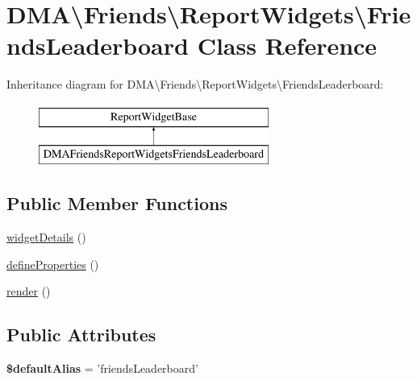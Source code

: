 \hypertarget{classDMA_1_1Friends_1_1ReportWidgets_1_1FriendsLeaderboard}{\section{D\-M\-A\textbackslash{}Friends\textbackslash{}Report\-Widgets\textbackslash{}Friends\-Leaderboard Class Reference}
\label{classDMA_1_1Friends_1_1ReportWidgets_1_1FriendsLeaderboard}
}
Inheritance diagram for D\-M\-A\textbackslash{}Friends\textbackslash{}Report\-Widgets\textbackslash{}Friends\-Leaderboard\-:\begin{figure}[H]
\begin{center}
\leavevmode
\includegraphics[height=2.000000cm]{dd/dbd/classDMA_1_1Friends_1_1ReportWidgets_1_1FriendsLeaderboard}
\end{center}
\end{figure}
\subsection*{Public Member Functions}
\begin{DoxyCompactItemize}
\item 
\hyperlink{classDMA_1_1Friends_1_1ReportWidgets_1_1FriendsLeaderboard_ac5fc1d8631aca255dee64a37ddeed5f6}{widget\-Details} ()
\item 
\hyperlink{classDMA_1_1Friends_1_1ReportWidgets_1_1FriendsLeaderboard_a8a2b873a91fc33c558834423e35da4bc}{define\-Properties} ()
\item 
\hyperlink{classDMA_1_1Friends_1_1ReportWidgets_1_1FriendsLeaderboard_acc5889523847a95eb855e6041c5ef92f}{render} ()
\end{DoxyCompactItemize}
\subsection*{Public Attributes}
\begin{DoxyCompactItemize}
\item 
\hypertarget{classDMA_1_1Friends_1_1ReportWidgets_1_1FriendsLeaderboard_ab1f836744d59c96df00f1fad2cddb01f}{{\bfseries \$default\-Alias} = 'friends\-Leaderboard'}\label{classDMA_1_1Friends_1_1ReportWidgets_1_1FriendsLeaderboard_ab1f836744d59c96df00f1fad2cddb01f}

\end{DoxyCompactItemize}


